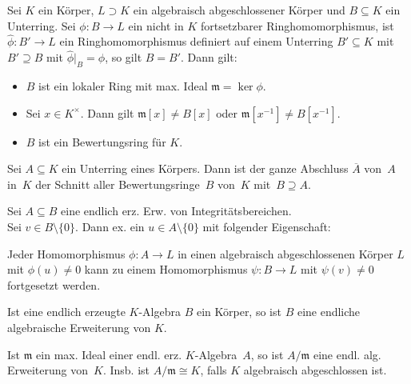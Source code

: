 \documentclass{cheat-sheet}
\newcommand{\mmm}{\mathfrak{m}}
\begin{document}

\begin{satz}
  Sei $K$ ein Körper, $L \supset K$ ein algebraisch abgeschlossener Körper und $B \subseteq K$ ein Unterring.
  Sei $\phi : B \to L$ ein nicht in $K$ fortsetzbarer Ringhomomorphismus, \dh{} ist $\hat{\phi} : B' \to L$ ein Ringhomomorphismus definiert auf einem Unterring $B' \subseteq K$ mit $B' \supseteq B$ mit $\hat{\phi}|_{B} = \phi$, so gilt $B = B'$.
  Dann gilt:
  \begin{itemize}
    \item $B$ ist ein lokaler Ring mit max. Ideal $\mmm = \ker \phi$.
    \item Sei $x \in K^{\times}$.
    Dann gilt $\mmm[x] \neq B[x]$ oder $\mmm[x^{-1}] \neq B[x^{-1}]$.
    \item $B$ ist ein Bewertungsring für $K$.
  \end{itemize}
\end{satz}

\begin{kor}
  Sei $A \subseteq K$ ein Unterring eines Körpers.
  Dann ist der ganze Abschluss $\overline{A}$ von~$A$ in~$K$ der Schnitt aller Bewertungsringe~$B$ von~$K$ mit~$B \supseteq A$.
\end{kor}

\begin{prop}
  Sei $A \subseteq B$ eine endlich erz. Erw. von Integritätsbereichen. \\
  Sei $v \in B \setminus \{ 0 \}$.
  Dann ex. ein $u \in A \setminus \{ 0 \}$ mit folgender Eigenschaft:
  
  \hfill\begin{minipage}{0.95 \linewidth}
    Jeder Homomorphismus $\phi : A \to L$ in einen algebraisch abgeschlossenen Körper $L$ mit $\phi(u) \neq 0$ kann zu einem Homomorphismus $\psi : B \to L$ mit $\psi(v) \neq 0$ fortgesetzt werden.
  \end{minipage}
\end{prop}


\begin{kor}
  Ist eine endlich erzeugte $K$-Algebra $B$ ein Körper, so ist $B$ eine endliche algebraische Erweiterung von $K$.
\end{kor}

\begin{kor}
  Ist $\mmm$ ein max. Ideal einer endl. erz. $K$-Algebra~$A$, so ist $A/\mmm$ eine endl. alg. Erweiterung von~$K$.
  Insb. ist $A/\mmm \cong K$, falls $K$ algebraisch abgeschlossen ist.
\end{kor}
\end{document}
